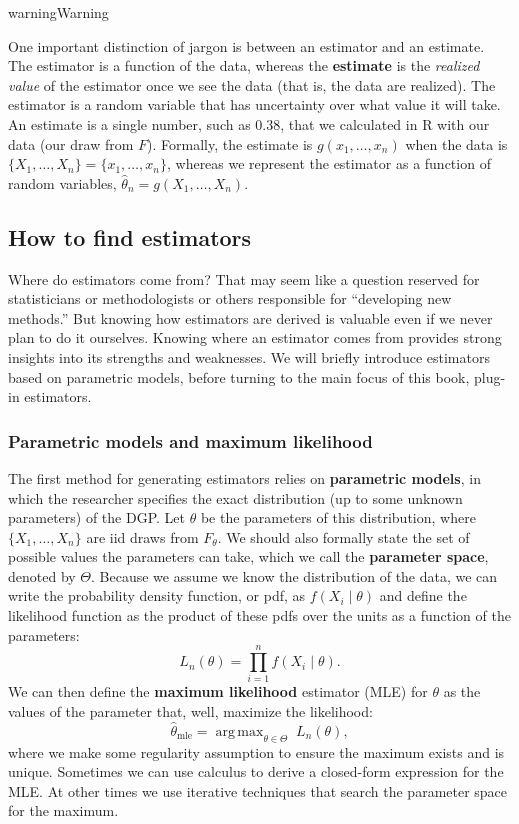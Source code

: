 \documentclass[
  13pt,
  letterpaper,
  DIV=11,
  numbers=noendperiod]{scrreprt}
\DeclareMathOperator*{\argmax}{arg\,max}
\theoremstyle{plain}
\theoremstyle{plain}
\theoremstyle{definition}
\theoremstyle{definition}
\theoremstyle{remark}
\begin{document}
\begin{bookcallout}{warning}{Warning}

One important distinction of jargon is between an estimator and an
estimate. The estimator is a function of the data, whereas the
\textbf{estimate} is the \emph{realized value} of the estimator once we
see the data (that is, the data are realized). The estimator is a random
variable that has uncertainty over what value it will take. An estimate
is a single number, such as 0.38, that we calculated in R with our data
(our draw from \(F\)). Formally, the estimate is \(g(x_1, \ldots, x_n)\)
when the data is \(\{X_1, \ldots, X_n\} = \{x_1, \ldots, x_n\}\),
whereas we represent the estimator as a function of random variables,
\(\widehat{\theta}_n = g(X_1, \ldots, X_n)\).

\end{bookcallout}

\subsection{How to find estimators}\label{how-to-find-estimators}

Where do estimators come from? That may seem like a question reserved
for statisticians or methodologists or others responsible for
``developing new methods.'' But knowing how estimators are derived is
valuable even if we never plan to do it ourselves. Knowing where an
estimator comes from provides strong insights into its strengths and
weaknesses. We will briefly introduce estimators based on parametric
models, before turning to the main focus of this book, plug-in
estimators.

\subsubsection{Parametric models and maximum
likelihood}\label{parametric-models-and-maximum-likelihood}

The first method for generating estimators relies on \textbf{parametric
models}, in which the researcher specifies the exact distribution (up to
some unknown parameters) of the DGP. Let \(\theta\) be the parameters of
this distribution, where \(\{X_1, \ldots, X_n\}\) are iid draws from
\(F_{\theta}\). We should also formally state the set of possible values
the parameters can take, which we call the \textbf{parameter space},
denoted by \(\Theta\). Because we assume we know the distribution of the
data, we can write the probability density function, or pdf, as
\(f(X_i \mid \theta)\) and define the likelihood function as the product
of these pdfs over the units as a function of the parameters: \[
L_n(\theta) = \prod_{i=1}^n f(X_i \mid \theta).
\] We can then define the \textbf{maximum likelihood} estimator (MLE)
for \(\theta\) as the values of the parameter that, well, maximize the
likelihood: \[
\widehat{\theta}_{\text{mle}} = \argmax_{\theta \in \Theta} \; L_n(\theta),
\] where we make some regularity assumption to ensure the maximum exists
and is unique. Sometimes we can use calculus to derive a closed-form
expression for the MLE. At other times we use iterative techniques that
search the parameter space for the maximum.
\end{document}
